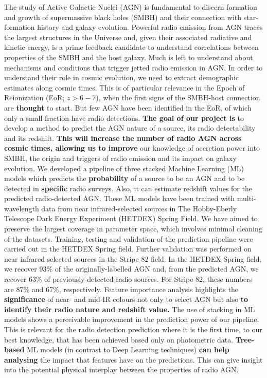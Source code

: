 \documentclass{aa}
\begin{document}
  \abstract
   {The study of Active Galactic Nuclei (AGN) is fundamental to discern formation and growth of supermassive black holes (SMBH) and their connection with star-formation history and galaxy evolution. Powerful radio emission from AGN traces the largest structures in the Universe and, given their associated radiative and kinetic energy, is a prime feedback candidate to understand correlations between properties of the SMBH and the host galaxy. Much is left to understand about mechanisms and conditions that trigger jetted radio emission in AGN. In order to understand their role in cosmic evolution, we need to extract demographic estimates along cosmic times. This is of particular relevance in the Epoch of Reionization (EoR; ${z{>}6-7}$), when the first signs of the SMBH-host connection are \textbf{thought} to start. But few AGN have been identified in the EoR, of which only a small fraction have radio detections.
   }
   {\textbf{The goal of our project is} to develop a method to predict the AGN nature of a source, its radio detectability and its redshift. \textbf{This will increase the number of radio AGN across cosmic times, allowing us to improve} our knowledge of accretion power into SMBH, the origin and triggers of radio emission and its impact on galaxy evolution.   
   }
   {We developed a pipeline of three stacked Machine Learning (ML) models which predicts the \textbf{probability} of a source to be an AGN and to be detected in \textbf{specific} radio surveys. Also, it can estimate redshift values for the predicted radio-detected AGN. These ML models have been trained with multi-wavelength data from near infrared-selected sources in The Hobby-Eberly Telescope Dark Energy Experiment (HETDEX) Spring Field. We have aimed to preserve the largest coverage in parameter space, which involves minimal cleaning of the datasets. Training, testing and validation of the prediction pipeline were carried out in the HETDEX Spring field. Further validation was performed on near infrared-selected sources in the Stripe 82 field.
   }
   {In the HETDEX Spring field, we recover $93\%$ of the originally-labelled AGN and, from the predicted AGN, we recover $63\%$ of previously-detected radio sources. For Stripe 82, these numbers are $87\%$ and $67\%$, respectively. Feature importance analysis highlights the \textbf{significance} of near- and mid-IR colours not only to select AGN but also \textbf{to identify their radio nature and redshift value.}
   }
   {The use of stacking in ML models shows a perceivable improvement in the prediction power of our pipeline. This is relevant for the radio detection prediction where it is the first time, to our best knowledge, that has been achieved based only on photometric data. \textbf{Tree-based} ML models (in contrast to Deep Learning techniques) \textbf{can help analysing} the impact that features have on the predictions. This can give insight into the potential physical interplay between the properties of radio AGN.}
\end{document}
